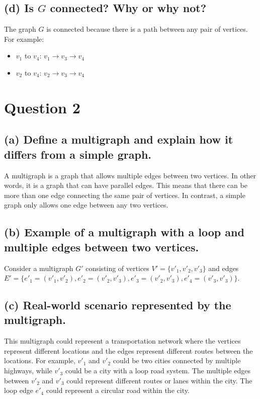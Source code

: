 \documentclass{article}
\begin{document}
\subsection*{(d) Is \( G \) connected? Why or why not?}
The graph \( G \) is connected because there is a path between any pair of vertices. For example:
\begin{itemize}
    \item \( v_1 \) to \( v_4 \): \( v_1 \to v_3 \to v_4 \)
    \item \( v_2 \) to \( v_4 \): \( v_2 \to v_3 \to v_4 \)
\end{itemize}

\section*{Question 2}
\subsection*{(a) Define a multigraph and explain how it differs from a simple graph.}
A multigraph is a graph that allows multiple edges between two vertices. In other words, it is a graph that can have parallel edges. This means that there can be more than one edge connecting the same pair of vertices. In contrast, a simple graph only allows one edge between any two vertices.

\subsection*{(b) Example of a multigraph with a loop and multiple edges between two vertices.}
Consider a multigraph \( G' \) consisting of vertices \( V' = \{v'_1, v'_2, v'_3\} \) and edges \( E' = \{e'_1 = (v'_1, v'_2), e'_2 = (v'_2, v'_3), e'_3 = (v'_2, v'_3), e'_4 = (v'_3, v'_3)\} \).

\subsection*{(c) Real-world scenario represented by the multigraph.}
This multigraph could represent a transportation network where the vertices represent different locations and the edges represent different routes between the locations. For example, \( v'_1 \) and \( v'_2 \) could be two cities connected by multiple highways, while \( v'_3 \) could be a city with a loop road system. The multiple edges between \( v'_2 \) and \( v'_3 \) could represent different routes or lanes within the city. The loop edge \( e'_4 \) could represent a circular road within the city.
\end{document}
